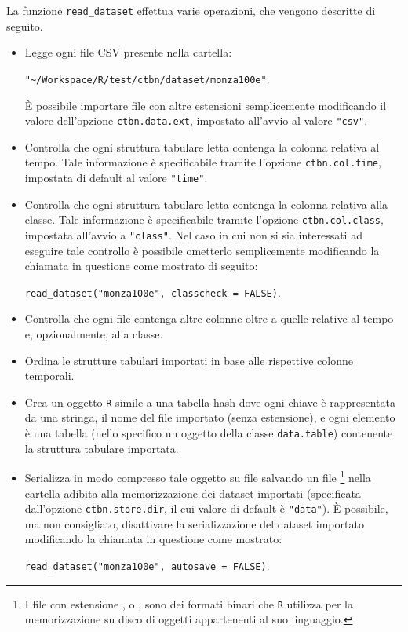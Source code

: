 La funzione \lstinline[language=rstats]{read_dataset} effettua varie operazioni, che vengono descritte di seguito.
\begin{itemize}
	\item Legge ogni file \acs{CSV} presente nella cartella:\par
	\lstinline[language=rstats]{"~/Workspace/R/test/ctbn/dataset/monza100e"}.\par
	\`E possibile importare file con altre estensioni semplicemente modificando il valore dell'opzione \lstinline$ctbn.data.ext$, impostato all'avvio al valore \lstinline[language=rstats]{"csv"}.
	\item Controlla che ogni struttura tabulare letta contenga la colonna relativa al tempo. Tale informazione è specificabile tramite l'opzione \lstinline$ctbn.col.time$, impostata di default al valore \lstinline[language=rstats]{"time"}.
	\item Controlla che ogni struttura tabulare letta contenga la colonna relativa alla classe. Tale informazione è specificabile tramite l'opzione \lstinline$ctbn.col.class$, impostata all'avvio a \lstinline[language=rstats]{"class"}. Nel caso in cui non si sia interessati ad eseguire tale controllo è possibile ometterlo semplicemente modificando la chiamata in questione come mostrato di seguito:\par
	\lstinline[language=rstats]{read_dataset("monza100e", classcheck = FALSE)}.
	\item Controlla che ogni file contenga altre colonne oltre a quelle relative al tempo e, opzionalmente, alla classe.
	\item Ordina le strutture tabulari importati in base alle rispettive colonne temporali.
	\item Crea un oggetto \lstinline$R$ simile a una tabella hash dove ogni chiave è rappresentata da una stringa, il nome del file importato (senza estensione), e ogni elemento è una tabella (nello specifico un oggetto della classe \lstinline$data.table$) contenente la struttura tabulare importata.
	\item Serializza in modo compresso tale oggetto su file salvando un file \footnote{I file con estensione , o , sono dei formati binari che \lstinline$R$ utilizza per la memorizzazione su disco di oggetti appartenenti al suo linguaggio.} nella cartella adibita alla memorizzazione dei dataset importati (specificata dall'opzione \lstinline$ctbn.store.dir$, il cui valore di default è \lstinline[language=rstats]{"data"}). \`E possibile, ma non consigliato, disattivare la serializzazione del dataset importato modificando la chiamata in questione come mostrato:\par
	\lstinline[language=rstats]{read_dataset("monza100e", autosave = FALSE)}.
\end{itemize}

